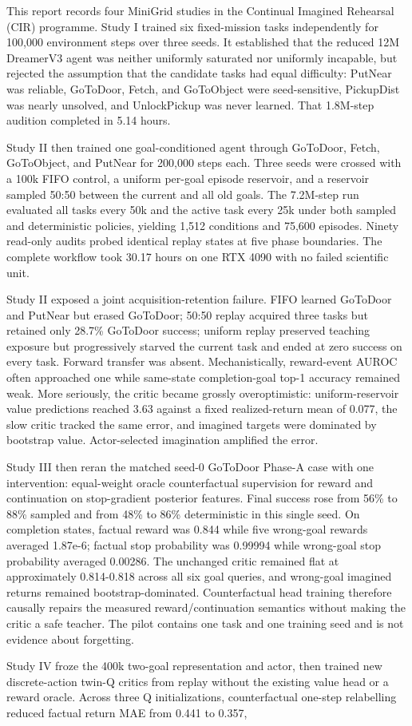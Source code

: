\documentclass[10pt,a4paper]{article}
\begin{document}
This report records four MiniGrid studies in the Continual Imagined Rehearsal (CIR) programme. Study I trained six fixed-mission tasks independently for 100,000 environment steps over three seeds. It established that the reduced 12M DreamerV3 agent was neither uniformly saturated nor uniformly incapable, but rejected the assumption that the candidate tasks had equal difficulty: PutNear was reliable, GoToDoor, Fetch, and GoToObject were seed-sensitive, PickupDist was nearly unsolved, and UnlockPickup was never learned. That 1.8M-step audition completed in 5.14 hours.\par Study II then trained one goal-conditioned agent through GoToDoor, Fetch, GoToObject, and PutNear for 200,000 steps each. Three seeds were crossed with a 100k FIFO control, a uniform per-goal episode reservoir, and a reservoir sampled 50:50 between the current and all old goals. The 7.2M-step run evaluated all tasks every 50k and the active task every 25k under both sampled and deterministic policies, yielding 1,512 conditions and 75,600 episodes. Ninety read-only audits probed identical replay states at five phase boundaries. The complete workflow took 30.17 hours on one RTX 4090 with no failed scientific unit.\par Study II exposed a joint acquisition-retention failure. FIFO learned GoToDoor and PutNear but erased GoToDoor; 50:50 replay acquired three tasks but retained only 28.7\% GoToDoor success; uniform replay preserved teaching exposure but progressively starved the current task and ended at zero success on every task. Forward transfer was absent. Mechanistically, reward-event AUROC often approached one while same-state completion-goal top-1 accuracy remained weak. More seriously, the critic became grossly overoptimistic: uniform-reservoir value predictions reached 3.63 against a fixed realized-return mean of 0.077, the slow critic tracked the same error, and imagined targets were dominated by bootstrap value. Actor-selected imagination amplified the error.\par Study III then reran the matched seed-0 GoToDoor Phase-A case with one intervention: equal-weight oracle counterfactual supervision for reward and continuation on stop-gradient posterior features. Final success rose from 56\% to 88\% sampled and from 48\% to 86\% deterministic in this single seed. On completion states, factual reward was 0.844 while five wrong-goal rewards averaged 1.87e-6; factual stop probability was 0.99994 while wrong-goal stop probability averaged 0.00286. The unchanged critic remained flat at approximately 0.814-0.818 across all six goal queries, and wrong-goal imagined returns remained bootstrap-dominated. Counterfactual head training therefore causally repairs the measured reward/continuation semantics without making the critic a safe teacher. The pilot contains one task and one training seed and is not evidence about forgetting.\par Study IV froze the 400k two-goal representation and actor, then trained new discrete-action twin-Q critics from replay without the existing value head or a reward oracle. Across three Q initializations, counterfactual one-step relabelling reduced factual return MAE from 0.441 to 0.357, 
\end{document}
